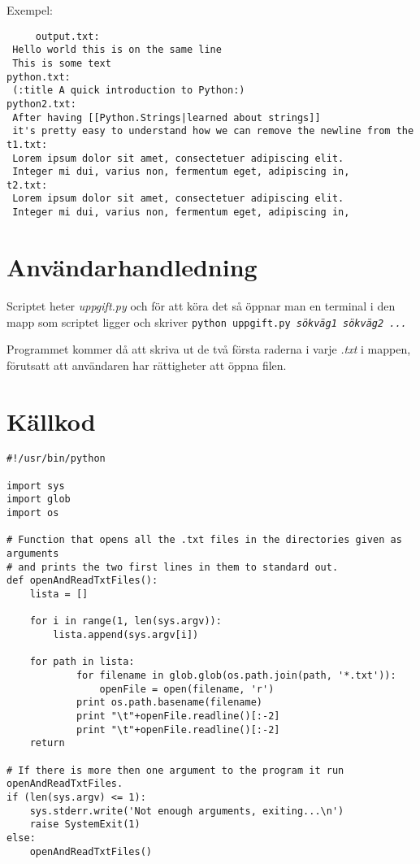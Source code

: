 \documentclass[11pt, titlepage, oneside, a4paper]{article}
\newcommand{\Section}[1]{\section{#1}\vspace{-8pt}}
\begin{document}
	Exempel:
	\begin{verbatim}
	 output.txt:
 Hello world this is on the same line
 This is some text
python.txt:
 (:title A quick introduction to Python:)
python2.txt:
 After having [[Python.Strings|learned about strings]]
 it's pretty easy to understand how we can remove the newline from the
t1.txt:
 Lorem ipsum dolor sit amet, consectetuer adipiscing elit. 
 Integer mi dui, varius non, fermentum eget, adipiscing in,
t2.txt:
 Lorem ipsum dolor sit amet, consectetuer adipiscing elit.
 Integer mi dui, varius non, fermentum eget, adipiscing in, 
	\end{verbatim}

	\Section{Användarhandledning}
	Scriptet heter \emph{uppgift.py} och för att köra det så öppnar man en terminal i den mapp som scriptet ligger och skriver \newline
	\texttt{python uppgift.py \emph{sökväg1 sökväg2 ...}}
	
	Programmet kommer då att skriva ut de två första raderna i varje \emph{.txt} i mappen, förutsatt att användaren har rättigheter att öppna filen.
	\Section{Källkod}
	\begin{lstlisting}
#!/usr/bin/python

import sys
import glob
import os

# Function that opens all the .txt files in the directories given as arguments
# and prints the two first lines in them to standard out.
def openAndReadTxtFiles():
	lista = []
		
	for i in range(1, len(sys.argv)):
	   	lista.append(sys.argv[i])
	
	for path in lista:
      		for filename in glob.glob(os.path.join(path, '*.txt')):
      			openFile = open(filename, 'r')
			print os.path.basename(filename)
			print "\t"+openFile.readline()[:-2]
			print "\t"+openFile.readline()[:-2]
	return

# If there is more then one argument to the program it run openAndReadTxtFiles.
if (len(sys.argv) <= 1):
    sys.stderr.write('Not enough arguments, exiting...\n')
    raise SystemExit(1)
else:    
	openAndReadTxtFiles()

	\end{lstlisting}

  
		
\end{document}
